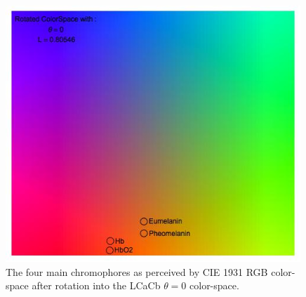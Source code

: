 \begin{figure}[h!]
  \centering
    \includegraphics[width=0.99\textwidth]{Chapter1/Figs/ChromophoresYAB.jpg}
    \caption{The four main chromophores as perceived by CIE 1931 RGB color-space after rotation into the LCaCb $\theta = 0$ color-space.}  \label{fig:ChromophoresYAB}
\end{figure}